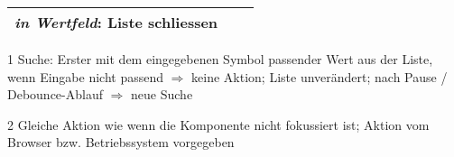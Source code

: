 \begin{table}[!htb]
\begin{adjustbox}{max width=\textwidth}
\begin{threeparttable}
\begin{tabular}{ l || l | l }
{                                                    \emph{in Wertfeld}: Liste schliessen} \\
                \hline
            \end{tabular}
            \begin{tablenotes}
                \scriptsize
                \item[1] Suche: Erster mit dem eingegebenen Symbol passender Wert aus der Liste, wenn Eingabe nicht passend $\Rightarrow$ keine Aktion; 
                                Liste unverändert; nach Pause / Debounce-Ablauf $\Rightarrow$ neue Suche
                \item[2] Gleiche Aktion wie wenn die Komponente nicht fokussiert ist; Aktion vom Browser bzw. Betriebssystem vorgegeben
            \end{tablenotes}
        \end{threeparttable}
    \end{adjustbox}
\end{table}
